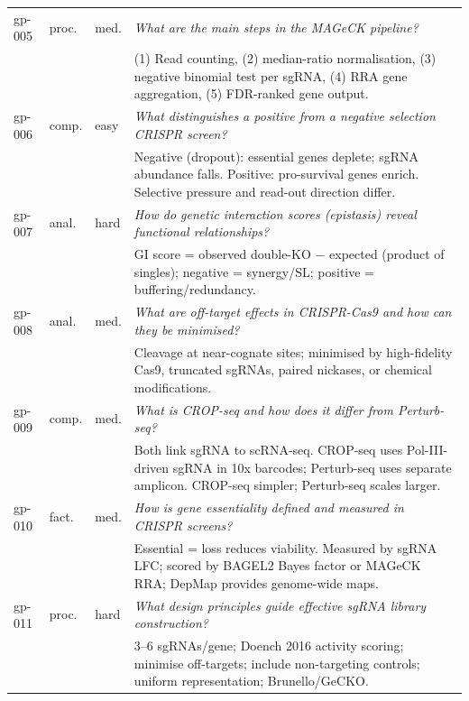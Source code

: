 \documentclass[12pt, a4paper]{article}
\begin{document}
\begin{longtable}{@{}llp{1.0cm}p{8.8cm}@{}}
gp-005 & proc. & med. &
  \textit{What are the main steps in the MAGeCK pipeline?}\\
& & & \scriptsize (1) Read counting, (2) median-ratio normalisation, (3) negative binomial test per sgRNA, (4) RRA gene aggregation, (5) FDR-ranked gene output. \\[2pt]

gp-006 & comp. & easy &
  \textit{What distinguishes a positive from a negative selection CRISPR screen?}\\
& & & \scriptsize Negative (dropout): essential genes deplete; sgRNA abundance falls. Positive: pro-survival genes enrich. Selective pressure and read-out direction differ. \\[2pt]

gp-007 & anal. & hard &
  \textit{How do genetic interaction scores (epistasis) reveal functional relationships?}\\
& & & \scriptsize GI score = observed double-KO $-$ expected (product of singles); negative = synergy/SL; positive = buffering/redundancy. \\[2pt]

gp-008 & anal. & med. &
  \textit{What are off-target effects in CRISPR-Cas9 and how can they be minimised?}\\
& & & \scriptsize Cleavage at near-cognate sites; minimised by high-fidelity Cas9, truncated sgRNAs, paired nickases, or chemical modifications. \\[2pt]

gp-009 & comp. & med. &
  \textit{What is CROP-seq and how does it differ from Perturb-seq?}\\
& & & \scriptsize Both link sgRNA to scRNA-seq. CROP-seq uses Pol-III-driven sgRNA in 10x barcodes; Perturb-seq uses separate amplicon. CROP-seq simpler; Perturb-seq scales larger. \\[2pt]

gp-010 & fact. & med. &
  \textit{How is gene essentiality defined and measured in CRISPR screens?}\\
& & & \scriptsize Essential = loss reduces viability. Measured by sgRNA LFC; scored by BAGEL2 Bayes factor or MAGeCK RRA; DepMap provides genome-wide maps. \\[2pt]

gp-011 & proc. & hard &
  \textit{What design principles guide effective sgRNA library construction?}\\
& & & \scriptsize 3--6 sgRNAs/gene; Doench 2016 activity scoring; minimise off-targets; include non-targeting controls; uniform representation; Brunello/GeCKO. \\[2pt]


\end{longtable}
\end{document}

